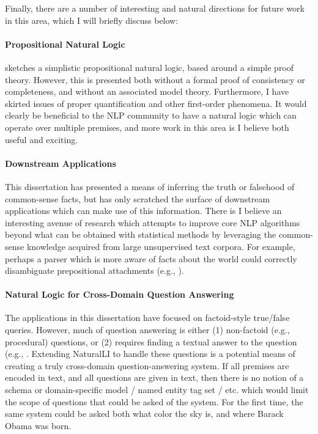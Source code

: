 Finally, there are a number of interesting and natural directions for future work in this area,
  which I will briefly discuss below:

\paragraph{Propositional Natural Logic}  sketches a simplistic propositional
  natural logic, based around a simple proof theory.
However, this is presented both without a formal proof of consistency or completeness, and without an
  associated model theory.
Furthermore, I have skirted issues of proper quantification and other first-order phenomena.
It would clearly be beneficial to the NLP community to have a natural logic which can operate over
  multiple premises, and more work in this area is I believe both useful and exciting.

\paragraph{Downstream Applications} This dissertation has presented a means of inferring the truth or
  falsehood of common-sense facts, but has only scratched the surface of downstream applications which
  can make use of this information.
There is I believe an interesting avenue of research which attempts to improve core NLP algorithms
  beyond what can be obtained with statistical methods by leveraging the common-sense knowledge acquired
  from large unsupervised text corpora.
For example, perhaps a parser which is more aware of facts about the world could correctly disambiguate
  prepositional attachments (e.g., ).

\paragraph{Natural Logic for Cross-Domain Question Answering}
The applications in this dissertation have focused on factoid-style true/false queries.
However, much of question answering is either (1) non-factoid (e.g., procedural) questions, or
  (2) requires finding a textual answer to the question (e.g., .
Extending NaturalLI to handle these questions is a potential means of creating a truly cross-domain
  question-answering system.
If all premises are encoded in text, and all questions are given in text, then there is no notion of
  a schema or domain-specific model / named entity tag set / etc. which would limit the scope of questions
  that could be asked of the system.
For the first time, the same system could be asked both what color the sky is, and where Barack Obama was
  born.


